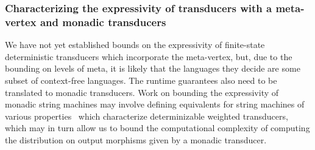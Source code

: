 \documentclass{article}
\theoremstyle{definition}
\theoremstyle{remark}
\begin{document}
\subsubsection{Characterizing the
expressivity of transducers with a meta-vertex
and monadic transducers}
We have not yet established bounds on the expressivity of
finite-state deterministic transducers which incorporate the
meta-vertex, but, due to the bounding on levels of meta, it is
likely that the languages they decide are some subset of context-free
languages. The runtime guarantees also need to be translated to
monadic transducers.
Work on bounding the expressivity of monadic string
machines may involve defining equivalents
for string machines of various
properties~\cite{mohri2004weighted, allauzen2004optimal, 
kostolanyi2022determinisability, bell2023computing} which
characterize determinizable weighted transducers, which may in turn
allow us to bound the computational complexity of computing the
distribution on output morphisms given by a monadic transducer.


\end{document}
